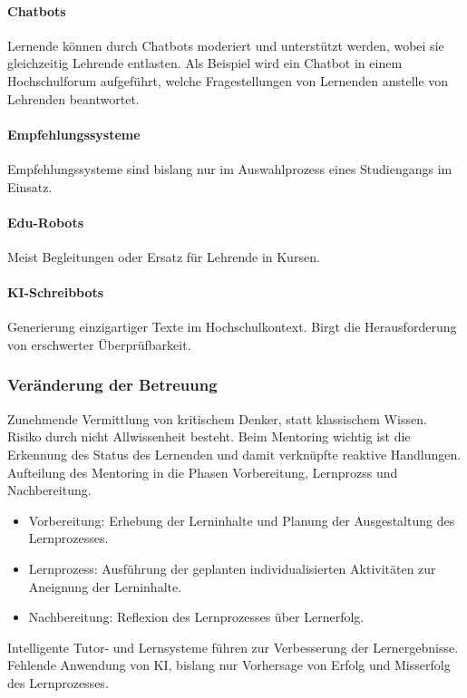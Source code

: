 \paragraph*{Chatbots}
Lernende können durch Chatbots moderiert und unterstützt werden, wobei sie gleichzeitig Lehrende entlasten. Als Beispiel wird ein Chatbot in einem Hochschulforum aufgeführt, welche Fragestellungen von Lernenden anstelle von Lehrenden beantwortet.

\paragraph*{Empfehlungssysteme}
Empfehlungssysteme sind bislang nur im Auswahlprozess eines Studiengangs im Einsatz.

\paragraph*{Edu-Robots}
Meist Begleitungen oder Ersatz für Lehrende in Kursen.

\paragraph*{KI-Schreibbots}
Generierung einzigartiger Texte im Hochschulkontext. Birgt die Herausforderung von erschwerter Überprüfbarkeit.

\subsubsection*{Veränderung der Betreuung}
Zunehmende Vermittlung von kritischem Denker, statt klassischem Wissen. Risiko durch nicht \glqq Allwissenheit\grqq{} besteht. Beim Mentoring wichtig ist die Erkennung des Status des Lernenden und damit verknüpfte reaktive Handlungen. Aufteilung des Mentoring in die Phasen Vorbereitung, Lernprozss und Nachbereitung.
\begin{itemize}
    \item Vorbereitung: Erhebung der Lerninhalte und Planung der Ausgestaltung des Lernprozesses.
    \item Lernprozess: Ausführung der geplanten individualisierten Aktivitäten zur Aneignung der Lerninhalte.
    \item Nachbereitung: Reflexion des Lernprozesses über Lernerfolg.
\end{itemize}
Intelligente Tutor- und Lernsysteme führen zur Verbesserung der Lernergebnisse. Fehlende Anwendung von KI, bislang nur Vorhersage von Erfolg und Misserfolg des Lernprozesses.


